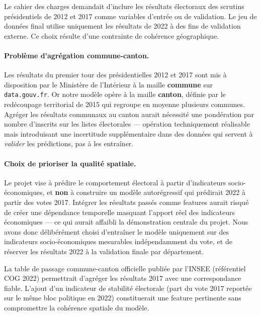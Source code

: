 Le cahier des charges demandait d'inclure les résultats électoraux des scrutins
présidentiels de 2012 et 2017 comme variables d'entrée ou de validation. Le jeu
de données final utilise uniquement les résultats de 2022 à des fins de validation
externe. Ce choix résulte d'une contrainte de cohérence géographique.

\paragraph{Problème d'agrégation commune-canton.}
Les résultats du premier tour des présidentielles 2012 et 2017 sont mis à
disposition par le Ministère de l'Intérieur à la maille \textbf{commune} sur
\texttt{data.gouv.fr}. Or notre modèle opère à la maille \textbf{canton}, définie
par le redécoupage territorial de 2015 qui regroupe en moyenne plusieurs communes.
Agréger les résultats communaux au canton aurait nécessité une pondération par
nombre d'inscrits sur les listes électorales --- opération techniquement réalisable
mais introduisant une incertitude supplémentaire dans des données qui servent à
\emph{valider} les prédictions, pas à les entraîner.

\paragraph{Choix de prioriser la qualité spatiale.}
Le projet vise à prédire le comportement électoral à partir d'indicateurs
socio-économiques, et \textbf{non} à construire un modèle autorégressif qui
prédirait 2022 à partir des votes 2017. Intégrer les résultats passés comme
features aurait risqué de créer une dépendance temporelle masquant l'apport réel
des indicateurs économiques --- ce qui aurait affaibli la démonstration centrale
du projet. Nous avons donc délibérément choisi d'entraîner le modèle uniquement
sur des indicateurs socio-économiques mesurables indépendamment du vote, et de
réserver les résultats 2022 à la validation finale par département.

\begin{infobox}[Perspective v2]
La table de passage commune-canton officielle publiée par l'INSEE (référentiel COG
2022) permettrait d'agréger les résultats 2017 avec une correspondance fiable.
L'ajout d'un indicateur de \og stabilité électorale \fg{} (part du vote 2017
reportée sur le même bloc politique en 2022) constituerait une feature pertinente
sans compromettre la cohérence spatiale du modèle.
\end{infobox}
